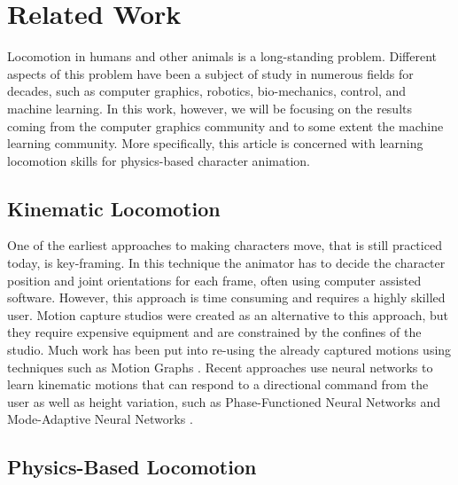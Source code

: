 \chapter{Related Work}
\label{ch:relatedwork}


Locomotion in humans and other animals is a long-standing problem. Different aspects of this problem have been a subject of study in numerous fields for decades, such as computer graphics, robotics, bio-mechanics, control, and machine learning. In this work, however, we will be focusing on the results coming from the computer graphics community and to some extent the machine learning community. More specifically, this article is concerned with learning locomotion skills for physics-based character animation.





\section{Kinematic Locomotion}

One of the earliest approaches to making characters move, that is still practiced today, is key-framing. In this technique the animator has to decide the character position and joint orientations for each frame, often using computer assisted software. However, this approach is time consuming and requires a highly skilled user. Motion capture studios were created as an alternative to this approach, but they require expensive equipment and are constrained by the confines of the studio. Much work has been put into re-using the already captured motions using techniques such as Motion Graphs \cite{Kovar:2002:MG:566570.566605}. Recent approaches use neural networks to learn kinematic motions that can respond to a directional command from the user as well as height variation, such as Phase-Functioned Neural Networks  \cite{PFNN} and Mode-Adaptive Neural Networks \cite{MANN}.

\section{Physics-Based Locomotion}

